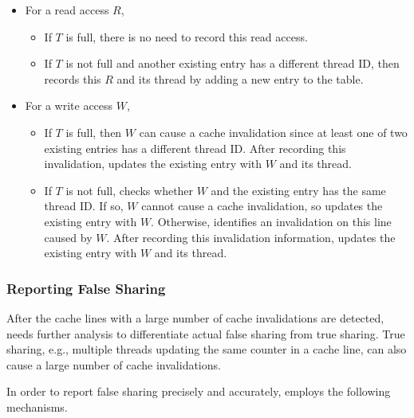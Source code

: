 \begin{itemize}
\item
  For a read access $R$, 
  \begin{itemize}
    \item
      If $T$ is full, there is no need to record this read access.
    \item
      If $T$ is not full and another existing entry has a different thread
      ID, then \Predator{} records this $R$ and its thread by adding a new entry to the table. 
  \end{itemize}
\item
  For a write access $W$, 
  \begin{itemize}
    \item
      If $T$ is full, then $W$ can cause a cache invalidation since at least one of two existing entries has a different thread ID.
      After recording this invalidation, \Predator{} updates the
      existing entry with $W$ and its thread.
    \item
      If $T$ is not full,
      \Predator{} checks whether $W$ and the existing entry has the same thread ID. If
      so, $W$ cannot cause a cache invalidation, so \Predator{} updates the existing
      entry with $W$. Otherwise, \Predator{} identifies an invalidation on this line caused by $W$. 
      After recording this invalidation information, \Predator{} updates the
      existing entry with $W$ and its thread.
  \end{itemize}
\end{itemize}

\subsubsection{Reporting False Sharing}

After the cache lines with a large number of cache invalidations are detected,
\Predator{} needs further analysis to differentiate actual false sharing from true sharing. 
True sharing, e.g., multiple threads updating the same counter in a cache line, can also cause a large number of cache invalidations.

In order to report false sharing precisely and accurately,  
\Predator{} employs the following mechanisms. 

